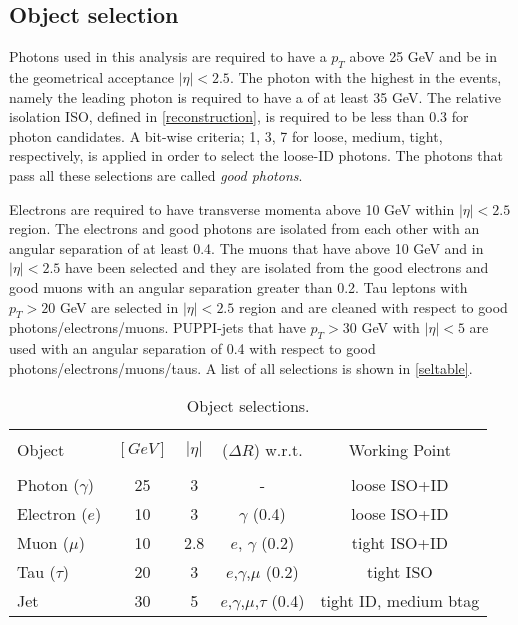 {\subsection{Object selection}

Photons used in this analysis are required to have a $p_T$ above 25 GeV and be in the geometrical acceptance $|\eta| < 2.5$. The photon with the highest \pt in the events, namely the leading photon is required to have a \pt of at least 35 GeV. The relative isolation ISO, defined in \autoref{reconstruction}, is required to be less than 0.3 for photon candidates. A bit-wise criteria; 1, 3, 7 for loose, medium, tight, respectively, is applied in order to select the loose-ID photons. The photons that pass all these selections are called \emph{good photons}.

Electrons are required to have transverse momenta above 10 GeV within $|\eta|<2.5$ region. The electrons and good photons are isolated from each other with an angular separation of at least 0.4. The muons that have \pt above 10 GeV and in $|\eta|<2.5$ have been selected and they are isolated from the good electrons and good muons with an angular separation greater than 0.2. Tau leptons with $p_T > 20$ GeV are selected in $|\eta|<2.5$ region and are cleaned with respect to good photons/electrons/muons. PUPPI-jets that have $p_T > 30$ GeV with $|\eta|<5$ are used with an angular separation of 0.4 with respect to good photons/electrons/muons/taus. A list of all selections is shown in \autoref{seltable}.

\begin{table*}[ht]
	{\setlength{\tabcolsep}{14pt}
		\caption{Object selections.}
		\begin{center}
			\vspace{-6mm}
			\begin{tabular}{lcccc}
				\hline \\[-2.45ex] \hline \\[-2.1ex]
				Object & \pt $\left[GeV\right]$ & $|\eta|$ & ($\Delta R$) w.r.t. & Working Point \\
				\hline \\[-1.8ex]
                Photon ($\gamma$) & 25 & 3 & - & loose ISO+ID \\
                Electron ($e$) & 10 & 3 & $\gamma$ (0.4) & loose ISO+ID \\
                Muon ($\mu$) & 10 & 2.8 & $e$, $\gamma$ (0.2) & tight ISO+ID \\
                Tau ($\tau$) & 20 & 3 & $e$,$\gamma$,$\mu$ (0.2) & tight ISO \\
                Jet & 30 & 5 & $e$,$\gamma$,$\mu$,$\tau$ (0.4) & tight ID, medium btag \\
				\hline
			\end{tabular}
			\vspace{-6mm}
		\end{center}
		\label{seltable}}
\end{table*}

}
